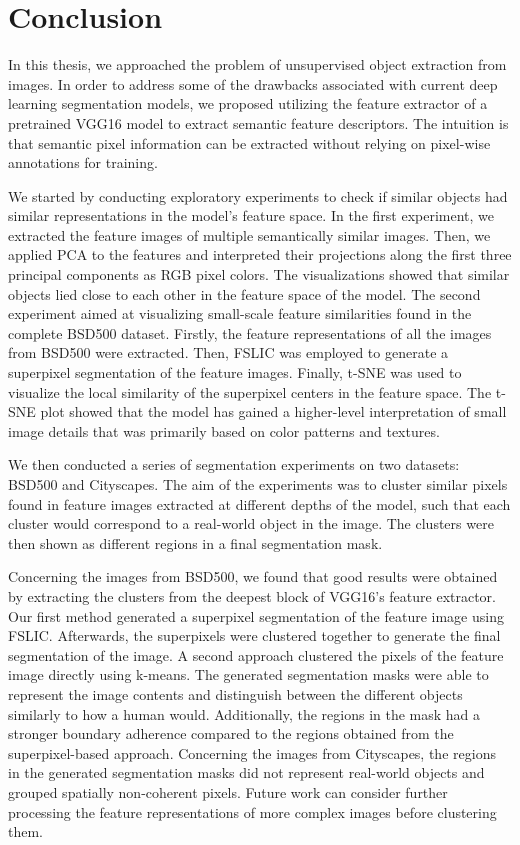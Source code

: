 \chapter{Conclusion}\label{chapter:conclusion}



In this thesis, we approached the problem of unsupervised object extraction from images. In order to address some of the drawbacks associated with current deep learning segmentation models, we proposed utilizing the feature extractor of a pretrained VGG16 model to extract semantic feature descriptors. The intuition is that semantic pixel information can be extracted without relying on pixel-wise annotations for training.

We started by conducting exploratory experiments to check if similar objects had similar representations in the model's feature space. In the first experiment, we extracted the feature images of multiple semantically similar images. Then, we applied PCA to the features and interpreted their projections along the first three principal components as RGB pixel colors. The visualizations showed that similar objects lied close to each other in the feature space of the model. The second experiment aimed at visualizing small-scale feature similarities found in the complete BSD500 dataset. Firstly, the feature representations of all the images from BSD500 were extracted. Then, FSLIC was employed to generate a superpixel segmentation of the feature images. Finally, t-SNE was used to visualize the local similarity of the superpixel centers in the feature space. The t-SNE plot showed that the model has gained a higher-level interpretation of small image details that was primarily based on color patterns and textures.

We then conducted a series of segmentation experiments on two datasets: BSD500 and Cityscapes. The aim of the experiments was to cluster similar pixels found in feature images extracted at different depths of the model, such that each cluster would correspond to a real-world object in the image. The clusters were then shown as different regions in a final segmentation mask.

Concerning the images from BSD500, we found that good results were obtained by extracting the clusters from the deepest block of VGG16's feature extractor. Our first method generated a superpixel segmentation of the feature image using FSLIC. Afterwards, the superpixels were clustered together to generate the final segmentation of the image. A second approach clustered the pixels of the feature image directly using k-means. The generated segmentation masks were able to represent the image contents and distinguish between the different objects similarly to how a human would. Additionally, the regions in the mask had a stronger boundary adherence compared to the regions obtained from the superpixel-based approach. Concerning the images from Cityscapes, the regions in the generated segmentation masks did not represent real-world objects and grouped spatially non-coherent pixels. Future work can consider further processing the feature representations of more complex images before clustering them. 

